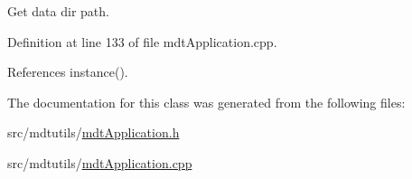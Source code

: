 Get data dir path. 



Definition at line 133 of file mdt\-Application.\-cpp.



References instance().



The documentation for this class was generated from the following files\-:\begin{DoxyCompactItemize}
\item 
src/mdtutils/\hyperlink{mdt_application_8h}{mdt\-Application.\-h}\item 
src/mdtutils/\hyperlink{mdt_application_8cpp}{mdt\-Application.\-cpp}\end{DoxyCompactItemize}
